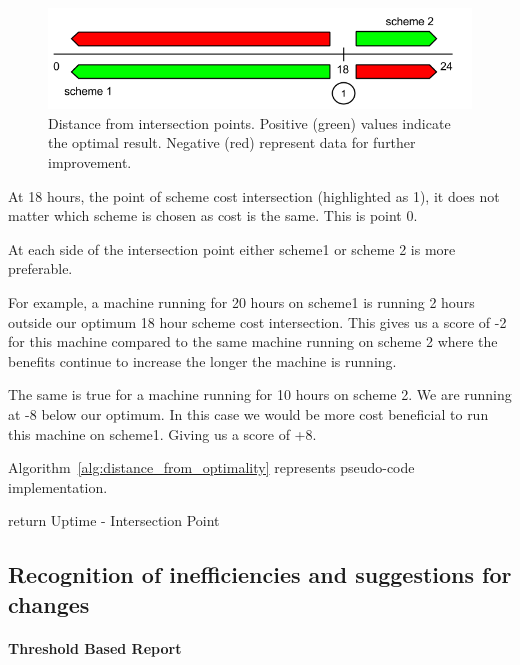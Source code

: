 \documentclass[]{final_report}
\newcommand{\myparagraph}[1]{\paragraph{#1}\mbox{}\\}
\begin{document}
\begin{figure}[H]
       \includegraphics[width=\linewidth]{figures/distance}
      \caption{Distance from intersection points. Positive (green) values indicate the optimal result. Negative (red) represent data for further improvement.}
        \label{fig:distance}
\end{figure}

At 18 hours, the point of scheme cost intersection (highlighted as 1), it does not matter which scheme is chosen as cost is the same. This is point 0.

At each side of the intersection point either scheme1 or scheme 2 is more preferable.

For example, a machine running for 20 hours on scheme1 is running 2 hours outside our optimum 18 hour scheme cost intersection. This gives us a score of -2 for this machine compared to the same machine running on scheme 2 where the benefits continue to increase the longer the machine is running.

The same is true for a machine running for 10 hours on scheme 2. We are running at -8 below our optimum. In this case we would be more cost beneficial to run this machine on scheme1. Giving us a score of +8.

Algorithm~\ref{alg:distance_from_optimality} represents pseudo-code implementation.


\begin{algorithm}[H]
 \label{alg:distance_from_optimality}
   {
        return Uptime - Intersection Point
  } 
\caption{Uptime Based Distance From Intersection Points}
\end{algorithm}

\subsection{Recognition of inefficiencies and suggestions for changes}

\myparagraph{Threshold Based Report}
\end{document}
